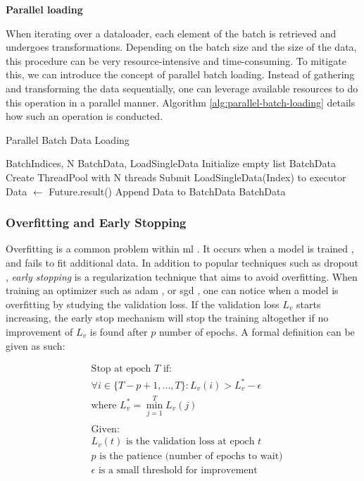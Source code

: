 {\textbf{Parallel loading}

When iterating over a dataloader, each element of the batch is retrieved and undergoes transformations. Depending on the batch size and  the size of the data, this procedure can be very resource-intensive and time-consuming. To mitigate this, we can introduce the concept of parallel batch loading. Instead of gathering and transforming the data sequentially, one can leverage available resources to do this operation in a parallel manner. Algorithm \ref{alg:parallel-batch-loading} details how such an operation is conducted.


\begin{algorithm}
\caption{Parallel Batch Data Loading}\label{alg:parallel-batch-loading}
\begin{algorithmic}
\Require BatchIndices, N
\Ensure BatchData, LoadSingleData
\State Initialize empty list BatchData
\State Create ThreadPool with N threads
    \State Submit LoadSingleData(Index) to executor
\EndFor
{}
    \State Data $\gets$ Future.result()
    \State Append Data to BatchData
\EndFor
\State \Return BatchData
\end{algorithmic}
\end{algorithm}
}

\subsubsection{Overfitting and Early Stopping}

Overfitting is a common problem within \acrlong{ml} \cite{srivastava2014dropout}. It occurs when a model is trained , and fails to fit additional data. In addition to popular techniques such as dropout \cite{srivastava2014dropout}, \textit{early stopping} is a regularization technique that aims to avoid overfitting. When training an optimizer such as \acrshort{adam} \cite{kingma2017adam}, or \acrshort{sgd} \cite{Rumelhart1986, Bottou2012}, one can notice when a model is overfitting by studying the validation loss. If the validation loss $L_v$ starts increasing, the early stop mechanism will stop the training altogether if no improvement of $L_v$ is found after $p$ number of epochs. A formal definition can be given as such:

\begin{align*}
&\text{Stop at epoch } T \text{ if:} \\
&\forall i \in \{T-p+1, ..., T\}: L_v(i) > L_v^* - \epsilon \\
&\text{where } L_v^* = \min_{j=1}^{T} L_v(j) \\
\\
&\text{Given:} \\
&L_v(t) \text{ is the validation loss at epoch } t \\
&p \text{ is the patience (number of epochs to wait)} \\
&\epsilon \text{ is a small threshold for improvement}
\end{align*}

